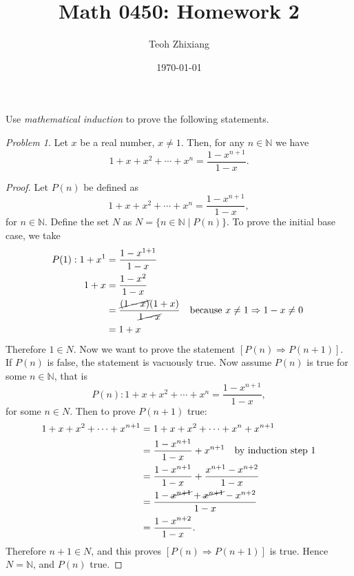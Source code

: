 \documentclass[11pt,twoside, reqno, align]{amsart}
\theoremstyle{remark}
\newtheorem{Prob}{Problem}
\def\N{\mathbb N}
\renewcommand{\implies}{\Rightarrow}
\begin{document}
\title{Math 0450: Homework 2}
\date{\today}
\author{Teoh Zhixiang}

\maketitle

Use \emph{mathematical induction} to prove the following statements.

\begin{Prob}
Let $x$ be a real number, $x \neq 1$. Then, for any $n \in \N$ we have
$$
1+x+x^2+\cdots+x^n=\frac{1-x^{n+1}}{1-x}.
$$
\end{Prob}

\begin{proof}
Let $P(n)$ be defined as
$$
1+x+x^2+\cdots+x^n=\frac{1-x^{n+1}}{1-x},
$$
for $n \in \N$. Define the set $N$ as $N = \{ n \in \N \mid P(n)\}$. To prove the initial base case, we take
\begin{align*}
P(1): 1 + x^1 & = \frac{1-x^{1+1}}{1-x} \\
    1 + x & = \frac{1-x^2}{1-x} \\
    & = \frac{\cancel{(1-x)}(1+x)}{\cancel{1-x}} \quad \text{because $x \neq 1 \implies 1-x \neq 0$ } \\
    & = 1 + x
\end{align*}
Therefore $1 \in N$. Now we want to prove the statement $[P(n) \implies P(n+1)]$. If $P(n)$ is false, the statement is vacuously true. Now assume $P(n)$ is true for some $n \in \N$, that is
\begin{equation}
    P(n): 1+x+x^2+\cdots+x^n=\frac{1-x^{n+1}}{1-x},
\end{equation}
for some $n \in N$. Then to prove $P(n+1)$ true:
\begin{align*}
    1 + x + x^2 + \cdots + x^{n+1} & = 1 + x + x^2 + \cdots + x^n + x^{n+1} \\
    & = \frac{1-x^{n+1}}{1-x} + x^{n+1} \quad \text{by induction step 1} \\
    & = \frac{1-x^{n+1}}{1-x} + \frac{x^{n+1} - x^{n+2}}{1-x} \\
    & = \frac{1 - \cancel{x^{n+1}} + \cancel{x^{n+1}} - x^{n+2}}{1-x} \\
    & = \frac{1 - x^{n+2}}{1-x}.
\end{align*}
Therefore ${n+1} \in N$, and this proves $[P(n) \implies P(n+1)]$ is true. Hence $N = \N$, and $P(n)$ true.
\end{proof}

\paragraph{}
\end{document}
